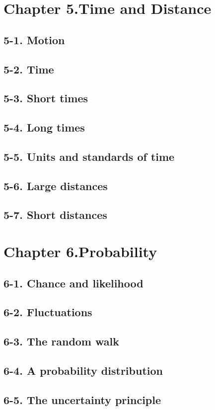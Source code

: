 \documentclass{article}
\begin{document}
\section{Chapter 5.Time and Distance}
\subsection{5-1. Motion}
\subsection{5-2. Time}
\subsection{5-3. Short times}
\subsection{5-4. Long times}
\subsection{5-5. Units and standards of time}
\subsection{5-6. Large distances}
\subsection{5-7. Short distances}
\section{Chapter 6.Probability}
\subsection{6-1. Chance and likelihood}
\subsection{6-2. Fluctuations}
\subsection{6-3. The random walk}
\subsection{6-4. A probability distribution}
\subsection{6-5. The uncertainty principle}
\end{document}
